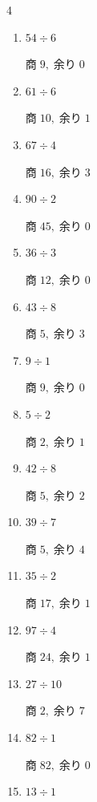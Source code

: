 \begin{multicols}{4}
\begin{enumerate}
        $商\; 0,\; 余り\; 1$

  \item $54 \div 6$

        $商\; 9,\; 余り\; 0$

  \item $61 \div 6$

        $商\; 10,\; 余り\; 1$

  \item $67 \div 4$

        $商\; 16,\; 余り\; 3$

  \item $90 \div 2$

        $商\; 45,\; 余り\; 0$

  \item $36 \div 3$

        $商\; 12,\; 余り\; 0$

  \item $43 \div 8$

        $商\; 5,\; 余り\; 3$

  \item $9 \div 1$

        $商\; 9,\; 余り\; 0$

  \item $5 \div 2$

        $商\; 2,\; 余り\; 1$

  \item $42 \div 8$

        $商\; 5,\; 余り\; 2$

\columnbreak %

  \item $39 \div 7$

        $商\; 5,\; 余り\; 4$

  \item $35 \div 2$

        $商\; 17,\; 余り\; 1$

  \item $97 \div 4$

        $商\; 24,\; 余り\; 1$

  \item $27 \div 10$

        $商\; 2,\; 余り\; 7$

  \item $82 \div 1$

        $商\; 82,\; 余り\; 0$

  \item $13 \div 1$


\end{enumerate}
\end{multicols}
